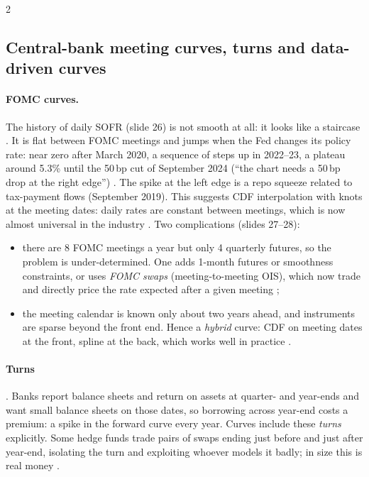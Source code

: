 \begin{paracol}{2}
\subsection{Central-bank meeting curves, turns and data-driven curves}\label{ch06:sec-fomc}
\paragraph{FOMC curves.} The history of daily SOFR (slide 26) is not smooth at all: it looks like a staircase
. It is flat between FOMC meetings and jumps when the Fed changes its policy rate: near zero
after March 2020, a sequence of steps up in 2022--23, a plateau around 5.3\% until the 50\,bp cut of September 2024
(``the chart needs a 50\,bp drop at the right edge'') . The spike at the left edge is a repo
squeeze related to tax-payment flows (September 2019). This suggests CDF interpolation with knots at the
meeting dates: daily rates are constant between meetings, which is now almost universal in the industry
. Two complications (slides 27--28):
\begin{itemize}
  \item there are 8 FOMC meetings a year but only 4 quarterly futures, so the problem is under-determined. One
        adds 1-month futures or smoothness constraints, or uses \emph{FOMC swaps} (meeting-to-meeting OIS), which
        now trade and directly price the rate expected after a given meeting ;
  \item the meeting calendar is known only about two years ahead, and instruments are sparse beyond the front end.
        Hence a \emph{hybrid} curve: CDF on meeting dates at the front, spline at the back, which works well in
        practice .
\end{itemize}

\paragraph{Turns} . Banks report balance sheets and return on assets at quarter- and year-ends and
want small balance sheets on those dates, so borrowing across year-end costs a premium: a spike in the forward
curve every year. Curves include these \emph{turns} explicitly. Some hedge funds trade pairs of swaps ending just
before and just after year-end, isolating the turn and exploiting whoever models it badly; in size this is real
money .


\end{paracol}
